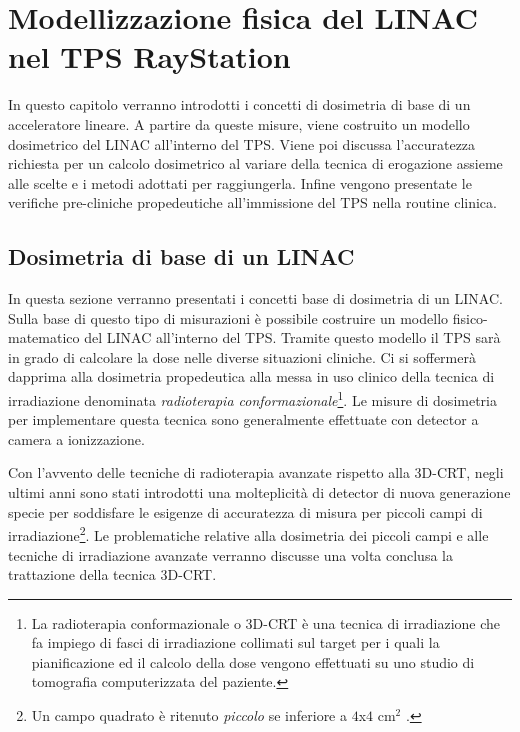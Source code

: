 \chapter{Modellizzazione f{}isica del LINAC nel TPS RayStation}
\minitoc
\textsf{In questo capitolo verranno introdotti i concetti di dosimetria di base di un acceleratore lineare. A partire da queste misure, viene costruito un modello dosimetrico del LINAC all'interno del TPS. Viene poi discussa l'accuratezza richiesta per un calcolo dosimetrico al variare della tecnica di erogazione assieme alle scelte e i metodi adottati per raggiungerla. Infine vengono presentate le verifiche pre-cliniche propedeutiche all'immissione del TPS nella routine clinica.}



\section{Dosimetria di base di un LINAC}

In questa sezione verranno presentati i concetti base di dosimetria di un LINAC. Sulla base di questo tipo di misurazioni è possibile costruire un modello fisico-matematico del LINAC all'interno del TPS. Tramite questo modello il TPS sarà in grado di calcolare la dose nelle diverse situazioni cliniche. Ci si soffermerà dapprima alla dosimetria propedeutica alla messa in uso clinico della tecnica di irradiazione denominata \textit{radioterapia conformazionale}\footnote{La radioterapia conformazionale o 3D-CRT è una tecnica di irradiazione che  fa impiego di fasci di irradiazione collimati sul target per i quali la pianificazione ed il calcolo della dose vengono effettuati su uno studio di tomografia computerizzata del paziente.}. Le misure di dosimetria per implementare questa tecnica sono generalmente effettuate con detector a camera a ionizzazione.

Con l'avvento delle tecniche di radioterapia avanzate rispetto alla 3D-CRT, negli ultimi anni sono stati introdotti una molteplicità di detector di nuova generazione specie per soddisfare le esigenze di accuratezza di misura per piccoli campi di irradiazione\footnote{Un campo quadrato è ritenuto \textit{piccolo} se inferiore a $4$x$4$ cm$^2$ \cite{Das2008}.}.  Le problematiche relative alla dosimetria dei piccoli campi e alle tecniche di irradiazione avanzate verranno discusse una volta conclusa la trattazione della tecnica 3D-CRT. 

